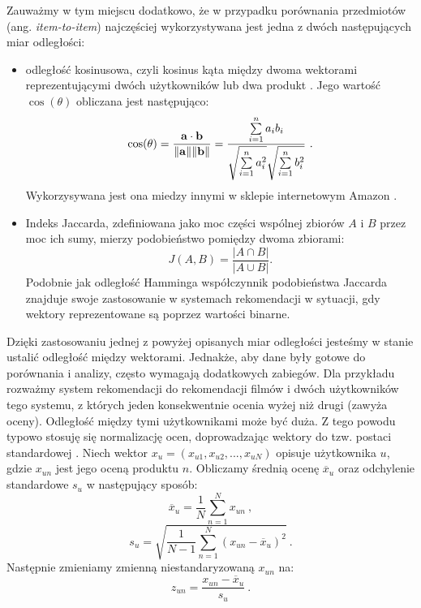 Zauważmy w tym miejscu dodatkowo, że w przypadku porównania przedmiotów (ang. \textit{item-to-item}) najczęściej wykorzystywana jest jedna z dwóch następujących miar odległości:
\begin{itemize}
    \item odległość kosinusowa, czyli kosinus kąta między dwoma wektorami reprezentującymi dwóch użytkowników lub dwa produkt \cite{Eksploracjatekstu}. Jego wartość $\cos(\theta)$ obliczana jest następująco:
    \begin{equation}
        \cos(\theta) = {\mathbf{a} \cdot \mathbf{b} \over \|\mathbf{a}\| \|\mathbf{b}\|} = \frac{ \sum\limits_{i=1}^{n}{a_i  b_i} }{ \sqrt{\sum\limits_{i=1}^{n}{a_i^2}}  \sqrt{\sum\limits_{i=1}^{n}{b_i^2}} }~.
    \end{equation}
    Wykorzysywana jest ona miedzy innymi w sklepie internetowym Amazon \cite{Amazon.comRecommendationsItem-to-ItemCollaborativeFiltering}.
    \item Indeks Jaccarda, zdefiniowana jako moc części wspólnej zbiorów $A$ i $B$ przez moc ich sumy, mierzy podobieństwo pomiędzy dwoma zbiorami:
    \begin{equation}
       J (A,B) = \frac{|A \cap B|}{|A \cup B|}.
    \end{equation}
    Podobnie jak odległość Hamminga współczynnik podobieństwa Jaccarda znajduje swoje zastosowanie w systemach rekomendacji w sytuacji, gdy wektory reprezentowane są poprzez wartości binarne.
\end{itemize}

Dzięki zastosowaniu jednej z powyżej opisanych miar odległości jesteśmy w stanie ustalić odległość między wektorami. Jednakże, aby dane były gotowe do porównania i analizy, często wymagają dodatkowych zabiegów. Dla przykładu rozważmy system rekomendacji do rekomendacji filmów i dwóch użytkowników tego systemu, z których jeden konsekwentnie ocenia wyżej niż drugi (zawyża oceny). Odległość między tymi użytkownikami może być duża. Z tego powodu 
typowo stosuję się normalizację ocen, doprowadzając wektory do tzw. postaci standardowej \cite{Similarityandrecommendersystems}.
Niech wektor $x_u = (x_{u1}, x_{u2}, ... , x_{uN})$ opisuje użytkownika $u$, gdzie $x_{un}$ jest jego oceną produktu $n$. Obliczamy średnią ocenę $\overline{x}_{u}$ oraz odchylenie standardowe $s_{u}$ w następujący sposób:
\begin{equation}
\label{eqn:normalizacja1}
     \overline{x}_{u} = \frac{1}{N}\sum_{n=1}^N x_{un}~,
\end{equation}
\begin{equation}
\label{eqn:normalizacja2}
    s_{u} = \sqrt{\frac{1}{N-1} \sum_{n=1}^N(x_{un} - \overline{x}_{u})^2}~.
\end{equation}
Następnie zmieniamy zmienną niestandaryzowaną $x_{un}$ na:
\begin{equation}
\label{eqn:normalizacja3}
    z_{un}= \frac{x_{un}-\overline{x}_{u}}{s_{u}}~.
\end{equation}

